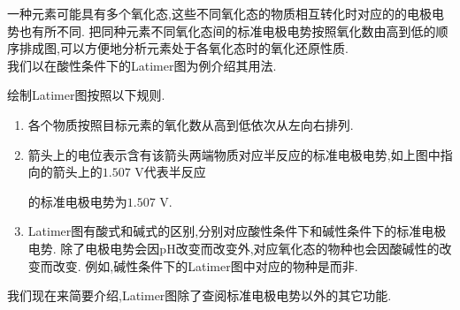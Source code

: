\documentclass{ctexart}
\begin{document}
\indent 一种元素可能具有多个氧化态,这些不同氧化态的物质相互转化时对应的的电极电势也有所不同.%
把同种元素不同氧化态间的标准电极电势按照氧化数由高到低的顺序排成图,可以方便地分析元素处于各氧化态时的氧化还原性质.\\
\indent 我们以在酸性条件下的Latimer图为例介绍其用法.
\begin{figure}[H]
    \centering
\end{figure}
\begin{theorem}[6D.3.3 Latimer图的画法]
    绘制Latimer图按照以下规则.
    \begin{enumerate}[topsep=0pt,parsep=0pt,itemsep=0pt,partopsep=0pt,leftmargin=*,label=\tbf{\arabic*.}]
        \item 各个物质按照目标元素的氧化数从高到低依次从左向右排列.
        \item 箭头上的电位表示含有该箭头两端物质对应半反应的标准电极电势,如上图中指向的箭头上的$1.507\text{ V}$代表半反应
            \begin{tightcenter}
            \end{tightcenter}
            的标准电极电势为$1.507\text{ V}$.
        \item Latimer图有酸式和碱式的区别,分别对应酸性条件下和碱性条件下的标准电极电势.%
            除了电极电势会因pH改变而改变外,对应氧化态的物种也会因酸碱性的改变而改变.%
            例如,碱性条件下的Latimer图中对应的物种是而非.
    \end{enumerate}
\end{theorem}
我们现在来简要介绍,Latimer图除了查阅标准电极电势以外的其它功能.
\end{document}
